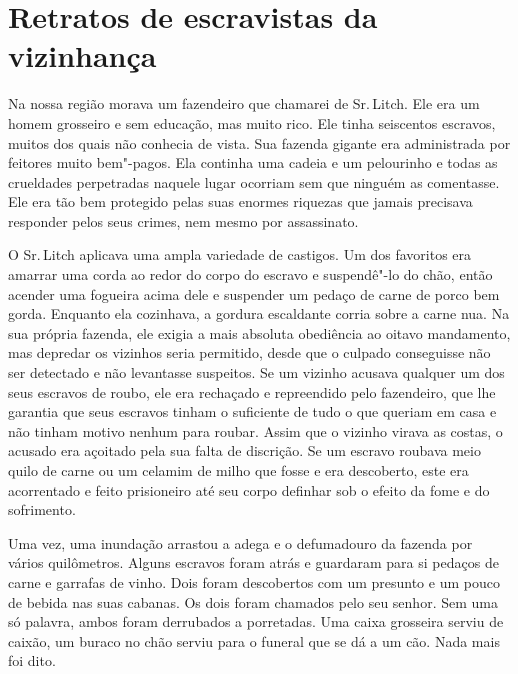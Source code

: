 
\chapter*{Retratos de escravistas da vizinhança}

Na nossa região morava um fazendeiro
que chamarei de Sr.\,Litch. Ele era um homem grosseiro e sem educação,
mas muito rico. Ele tinha seiscentos escravos, muitos dos quais não
conhecia de vista. Sua fazenda gigante era administrada por feitores
muito bem"-pagos. Ela continha uma cadeia e um pelourinho e todas as
crueldades perpetradas naquele lugar ocorriam sem que ninguém as
comentasse. Ele era tão bem protegido pelas suas enormes riquezas que
jamais precisava responder pelos seus crimes, nem mesmo por assassinato.

O Sr.\,Litch aplicava uma ampla
variedade de castigos. Um dos favoritos era amarrar uma corda ao redor
do corpo do escravo e suspendê"-lo do chão, então acender uma fogueira
acima dele e suspender um pedaço de carne de porco bem gorda. Enquanto
ela cozinhava, a gordura escaldante corria sobre a carne nua. Na sua
própria fazenda, ele exigia a mais absoluta obediência ao oitavo
mandamento, mas depredar os vizinhos seria permitido, desde que o
culpado conseguisse não ser detectado e não levantasse suspeitos. Se um
vizinho acusava qualquer um dos seus escravos de roubo, ele era
rechaçado e repreendido pelo fazendeiro, que lhe garantia que seus
escravos tinham o suficiente de tudo o que queriam em casa e não tinham
motivo nenhum para roubar. Assim que o vizinho virava as costas, o
acusado era açoitado pela sua falta de discrição. Se um escravo roubava
meio quilo de carne ou um celamim de milho que fosse e era descoberto,
este era acorrentado e feito prisioneiro até seu corpo definhar sob o
efeito da fome e do sofrimento.

Uma vez, uma inundação arrastou a adega
e o defumadouro da fazenda por vários quilômetros. Alguns escravos foram
atrás e guardaram para si pedaços de carne e garrafas de vinho. Dois
foram descobertos com um presunto e um pouco de bebida nas suas cabanas.
Os dois foram chamados pelo seu senhor. Sem uma só palavra, ambos foram
derrubados a porretadas. Uma caixa grosseira serviu de caixão, um buraco
no chão serviu para o funeral que se dá a um cão. Nada mais foi dito.

